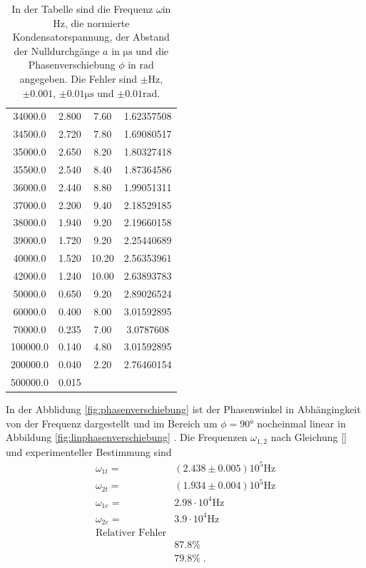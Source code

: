 \begin{table}
\begin{tabular}{c c c c}
       34000.0  &  2.800  &  7.60  & 1.62357508\\
       34500.0  &  2.720  &  7.80  & 1.69080517\\
       35000.0  &  2.650  &  8.20  & 1.80327418\\
       35500.0  &  2.540  &  8.40  & 1.87364586\\
       36000.0  &  2.440  &  8.80  & 1.99051311\\
       37000.0  &  2.200  &  9.40  & 2.18529185\\
       38000.0  &  1.940  &  9.20  & 2.19660158\\
       39000.0  &  1.720  &  9.20  & 2.25440689\\
       40000.0  &  1.520  & 10.20  & 2.56353961\\
       42000.0  &  1.240  & 10.00  & 2.63893783\\
       50000.0  &  0.650  &  9.20  & 2.89026524\\
       60000.0  &  0.400  &  8.00  & 3.01592895\\
       70000.0  &  0.235  &  7.00  & 3.0787608 \\
      100000.0  &  0.140  &  4.80  & 3.01592895\\
      200000.0  &  0.040  &  2.20  & 2.76460154\\
      500000.0  &  0.015  &        & \\
  \end{tabular}
  \caption{In der Tabelle sind die Frequenz $\omega$in $\si{\hertz}$, die normierte
  Kondensatorspannung, der Abstand der Nulldurchgänge $a$ in $\si{\micro\second}$
  und die Phasenverschiebung $\phi$ in $\si{\radian}$ angegeben. Die Fehler sind
  $\pm\si{\hertz}$,$ \pm0.001$, $\pm0.01\si{\micro\second}$ und $\pm0.01\si{\radian}.$
  }

  \label{fig:Messwerte}
\end{table}
In der Abblidung \ref{fig:phasenverschiebung} ist der Phasenwinkel in Abhängingkeit
von der Frequenz dargestellt und im Bereich um $\phi=90°$ nocheinmal linear in
Abbildung \ref{fig:linphasenverschiebung} . Die Frequenzen $\omega_{1,2}$ nach Gleichung \eqref{} und
experimenteller Bestimmung sind
\begin{align*}
  \omega_{1t}=&(2.438 \pm0.005)10^5\si{\hertz}\\
  \omega_{2t}=&(1.934 \pm0.004)10^5\si{\hertz}\\
  \omega_{1e}=&2.98 \cdot10^4\si{\hertz}\\
  \omega_{2e}=&3.9 \cdot10^4\si{\hertz}\\
  \text{Relativer Fehler}\\
   &87.8\%\\
   &79.8\%\;.
\end{align*}
